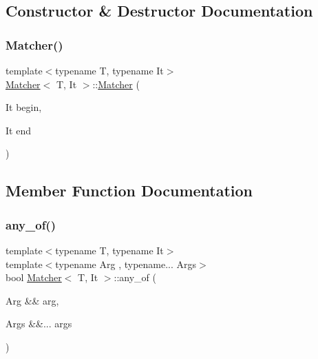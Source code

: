 \subsection{Constructor \& Destructor Documentation}
\mbox{\label{class_matcher_a6a90be25ea49908ed9d6c23f8bb9c47f}} 
\subsubsection{\texorpdfstring{Matcher()}{Matcher()}}
{\footnotesize\ttfamily template$<$typename T, typename It$>$ \\
\hyperlink{class_matcher}{Matcher}$<$ T, It $>$\+::\hyperlink{class_matcher}{Matcher} (\begin{DoxyParamCaption}\item[{It}]{begin,  }\item[{It}]{end }\end{DoxyParamCaption})\hspace{0.3cm}{\ttfamily [inline]}}



\subsection{Member Function Documentation}
\mbox{\label{class_matcher_a1db8b27d158ba0010bf7c69559773112}} 
\subsubsection{\texorpdfstring{any\+\_\+of()}{any\_of()}\hspace{0.1cm}{\footnotesize\ttfamily [1/2]}}
{\footnotesize\ttfamily template$<$typename T, typename It$>$ \\
template$<$typename Arg , typename... Args$>$ \\
bool \hyperlink{class_matcher}{Matcher}$<$ T, It $>$\+::any\+\_\+of (\begin{DoxyParamCaption}\item[{Arg \&\&}]{arg,  }\item[{Args \&\&...}]{args }\end{DoxyParamCaption})\hspace{0.3cm}{\ttfamily [inline]}}


